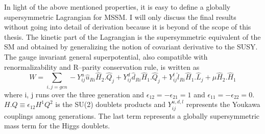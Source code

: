 In light of the above mentioned properties, it is easy to define a globally supersymmetric Lagrangian for MSSM. I will only discuss the final results without going into detail of derivation because it is beyond of the scope of this thesis. The kinetic part of the Lagrangian is the supersymmetric equivalent of the SM and obtained by generalizing the notion of covariant derivative to the SUSY. The   gauge invariant general superpotential, also compatible with renormalizability and R–parity conservation rule, is written as
\begin{equation}\label{equ:mssmpotential}
W = \sum_{i,j=gen}-Y_{ij}^{u}\hat{u}_{Ri}\hat{H}_{2}.\hat{Q}_{j} + Y_{ij}^{d}\hat{d}_{Ri}\hat{H}_{1}.\hat{Q}_{j} + Y_{ij}^{l}\hat{l}_{Ri}\hat{H}_{1}.\hat{L}_{j} + \mu \hat{H}_{2}.\hat{H}_{1}
\end{equation}
where i, j runs over the three generation and $\epsilon_{12}=-\epsilon_{21}=1$ and $\epsilon_{11}=-\epsilon_{22}=0$. $H . Q \equiv \epsilon_{12}H^{1}Q^{2}$ is the SU(2) doublets products and $Y_{ij}^{u,d,l}$ represents the Youkawa couplings among generations. The last term represents a globally supersymmetric mass term for the Higgs doublets.
